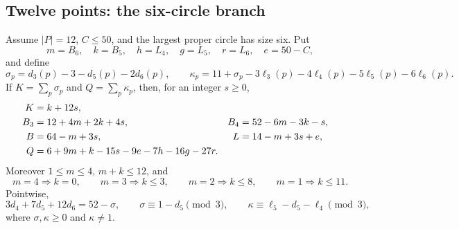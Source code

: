 \subsection{Twelve points: the six-circle branch}

\begin{lemma}\label{lem:n12-g6-spine}
Assume $|P|=12$, $C\le50$, and the largest proper circle has size six.  Put
\[
 m=B_6,\quad k=B_5,\quad h=L_4,\quad g=L_5,\quad r=L_6,\quad e=50-C,
\]
and define
\[
 \sigma_p=d_3(p)-3-d_5(p)-2d_6(p),\qquad
 \kappa_p=11+\sigma_p-3\ell_3(p)-4\ell_4(p)
             -5\ell_5(p)-6\ell_6(p).
\]
If $K=\sum_p\sigma_p$ and $Q=\sum_p\kappa_p$, then, for an integer
$s\ge0$,
\begin{align}
K&=k+12s,\label{eq:n12-g6-K}\\
B_3&=12+4m+2k+4s,&
B_4&=52-6m-3k-s,\notag\\
B&=64-m+3s,&
L&=14-m+3s+e,\label{eq:n12-g6-normalization}\\
Q&=6+9m+k-15s-9e-7h-16g-27r.\label{eq:n12-g6-Q}
\end{align}
Moreover $1\le m\le4$, $m+k\le12$, and
\begin{equation}\label{eq:n12-g6-gram-caps}
m=4\Rightarrow k=0,\qquad
m=3\Rightarrow k\le3,\qquad
m=2\Rightarrow k\le8,\qquad
m=1\Rightarrow k\le11.
\end{equation}
Pointwise,
\begin{equation}\label{eq:n12-g6-residues}
3d_4+7d_5+12d_6=52-\sigma,\qquad
\sigma\equiv1-d_5\pmod3,\qquad
\kappa\equiv\ell_5-d_5-\ell_4\pmod3,
\end{equation}
where $\sigma,\kappa\ge0$ and $\kappa\ne1$.
\end{lemma}

